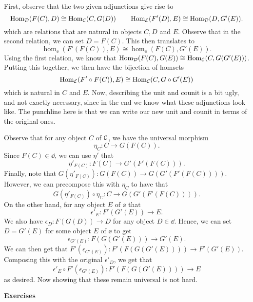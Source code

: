     \begin{prf}
        First, observe that the two given adjunctions give rise to 
        \[
            \operatorname{\mathrm{Hom}}_{\mathcal{D}}(F(C), D) \cong \operatorname{\mathrm{Hom}}_{\mathcal{C}}(C, G(D)) 
            \qquad 
            \operatorname{\mathrm{Hom}}_{\mathcal{E}}(F'(D), E) \cong \operatorname{\mathrm{Hom}}_{\mathcal{D}}(D, G'(E)).
        \]
        which are relations that are natural in objects $C, D$ and
        $E$. Observe that in the second relation, we can set $D =
        F(C)$. This then translates to 
        \[
            \hom_{\ee}(F'(F(C)), E) \cong \hom_{\dd}(F(C), G'(E)).
        \]
        Using the first relation, we know that 
        $\operatorname{\mathrm{Hom}}_{\mathcal{D}}(F(C), G(E)) \cong \operatorname{\mathrm{Hom}}_{\mathcal{C}}(C, G(G'(E)))$.
        Putting this together, we then have the bijection of homsets 
        \[
            \operatorname{\mathrm{Hom}}_{\mathcal{E}}(F'\circ F(C)), E) \cong \operatorname{\mathrm{Hom}}_{\mathcal{C}}(C, G \circ G'(E))
        \]
        which is natural in $C$ and $E$. Now, describing the
        unit and counit is a bit ugly, and not exactly necessary, since in
        the end we know what these adjunctions look like. The
        punchline here is that we can write our new unit and counit in
        terms of the original ones. 

        Observe that for any object $C$ of $\mathcal{C}$, we have the universal
        morphism 
        \[
             \eta_C: C \to G(F(C)).
        \]
        Since $F(C) \in \dd$, we can use $\eta'$ that
        \[
            \eta'_{F(C)}: F(C) \to G'(F'(F(C))).            
        \]
        Finally, note that $G(\eta'_{F(C)}): G(F(C)) \to G(G'(F'(F(C))))$.
        However, we can precompose this with $\eta_C$ to have that 
        \[
            G(\eta'_{F(C)}) \circ \eta_C: C \to G(G'(F'(F(C)))).
        \]
        On the other hand, for any object $E$ of $\ee$ that 
        \[
            \epsilon'_E : F'(G'(E)) \to E.
        \]
        We also have $\epsilon_D : F(G(D)) \to D$ for any object $D
        \in \dd$. Hence, 
        we can set $D = G'(E)$ for some object $E$ of $\ee$
        to get
        \[
            \epsilon_{G'(E)} : F(G(G'(E))) \to G'(E).
        \]
        We can then get that $F'(\epsilon_{G'(E)}) : F'(F(G(G'(E))))
        \to F'(G'(E))$. Composing this with the original
        $\epsilon'_D$, we get that 
        \[
            \epsilon'_E \circ F'(\epsilon_{G'(E)}): F'(F(G(G'(E)))) \to E
        \] 
        as desired. Now showing that these remain universal is not
        hard.
    \end{prf}

    {\large \textbf{Exercises}
    \vspace{0.5cm}}

